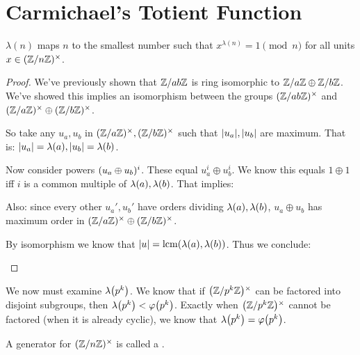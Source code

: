 \section{Carmichael's Totient Function}

\begin{definition}
   $\lambda(n)$ maps $n$ to the
  smallest number such that $x^{\lambda(n)} = 1 \pmod{n}$ for all units
  $x \in \Zmodnx$.
\end{definition}

\begin{theorem}
  \begin{nedqn}
  \eqcol
    \lcm{}
  \end{nedqn}
\end{theorem}

\begin{proof}
  We've previously shown that $\Zmod{ab}$ is ring isomorphic to
  $\Zmod{a} \oplus \Zmod{b}$. We've showed this implies an isomorphism
  between the groups $\Zmodx{ab}$ and $\Zmodax \oplus \Zmodbx$.

  So take any $u_a, u_b$ in $\Zmodax, \Zmodbx$ such that $\order{u_a},
  \order{u_b}$ are maximum. That is: $\order{u_a} = \lambdaf{a},
  \order{u_b} = \lambdaf{b}$.

  Now consider powers $\parens{u_a \oplus u_b}^i$. These equal $u_a^i
  \oplus u_b^i$. We know this equals $1 \oplus 1$ iff $i$ is a common
  multiple of $\lambdaf{a}, \lambdaf{b}$. That implies:

  \begin{nedqn}
  \eqcol
  \end{nedqn}

  Also: since every other $u_a', u_b'$ have orders dividing
  $\lambdaf{a}, \lambdaf{b}$, $u_a \oplus u_b$ has maximum order in
  $\Zmodax \oplus \Zmodbx$.

  By isomorphism we know that $\order{u} = \lcmf{\lambdaf{a},
  \lambdaf{b}}$. Thus we conclude:

  \begin{nedqn}
  \eqcol
  \end{nedqn}
\end{proof}

\begin{remark}
  We now must examine $\lambdaf{p^k}$. We know that if $\Zmodx{p^k}$ can
  be factored into disjoint subgroups, then $\lambdaf{p^k} <
  \vphif{p^k}$. Exactly when $\Zmodx{p^k}$ cannot be factored (when it
  is already cyclic), we know that $\lambdaf{p^k} = \vphif{p^k}$.

  A generator for $\Zmodx{n}$ is called a .
\end{remark}

